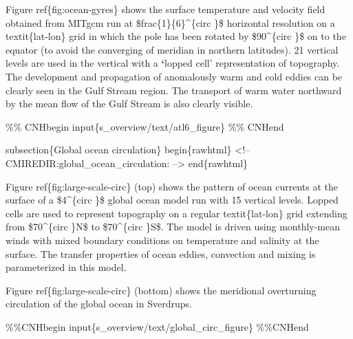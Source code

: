 \documentclass[letterpaper,10pt,english]{sphinxmanual}
\begin{document}
Figure ref\{fig:ocean-gyres\} shows the surface temperature and
velocity field obtained from MITgcm run at \$frac\{1\}\{6\}\textasciicircum{}\{circ \}\$
horizontal resolution on a textit\{lat-lon\} grid in which the pole has
been rotated by \$90\textasciicircum{}\{circ \}\$ on to the equator (to avoid the
converging of meridian in northern latitudes). 21 vertical levels are
used in the vertical with a {\color{red}\bfseries{}{}`}lopped cell' representation of
topography. The development and propagation of anomalously warm and
cold eddies can be clearly seen in the Gulf Stream region. The
transport of warm water northward by the mean flow of the Gulf Stream
is also clearly visible.

\%\% CNHbegin
input\{s\_overview/text/atl6\_figure\}
\%\% CNHend

subsection\{Global ocean circulation\}
begin\{rawhtml\}
\textless{}!-- CMIREDIR:global\_ocean\_circulation: --\textgreater{}
end\{rawhtml\}

Figure ref\{fig:large-scale-circ\} (top) shows the pattern of ocean
currents at the surface of a \$4\textasciicircum{}\{circ \}\$ global ocean model run with
15 vertical levels. Lopped cells are used to represent topography on a
regular textit\{lat-lon\} grid extending from \$70\textasciicircum{}\{circ \}N\$ to
\$70\textasciicircum{}\{circ \}S\$. The model is driven using monthly-mean winds with
mixed boundary conditions on temperature and salinity at the surface.
The transfer properties of ocean eddies, convection and mixing is
parameterized in this model.

Figure ref\{fig:large-scale-circ\} (bottom) shows the meridional overturning
circulation of the global ocean in Sverdrups.

\%\%CNHbegin
input\{s\_overview/text/global\_circ\_figure\}
\%\%CNHend
\end{document}
